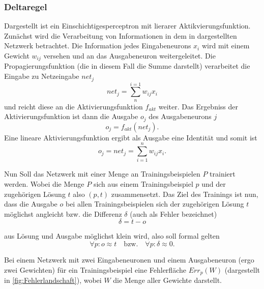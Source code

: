 \subsubsection{Deltaregel}\label{sec:deltaregel}


Dargestellt ist ein Einschichtigesperceptron mit lierarer Aktikvierungsfunktion.
Zunächst wird die Verarbeitung von Informationen in dem in  dargestellten Netzwerk betrachtet. Die Information jedes Eingabeneurons $x_i$ wird mit einem Gewicht $w_{ij}$ versehen und an das Ausgabeneuron weitergeleitet. Die Propagierungsfunktion (die in diesem Fall die Summe darstellt) verarbeitet die Eingabe zu Netzeingabe $net_j$
\begin{equation}
net_j= \sum^{i=1}_n w_{ij} x_i
\end{equation}
und reicht diese an die Aktivierungsfunktion $f_{akt}$ weiter. Das Ergebniss der Aktivierungsfunktion ist dann die Ausgabe $o_j$ des Ausgabeneurons $j$
\begin{equation}
o_j= f_{akt}(net_j).
\end{equation}
Eine lineare Aktivierungsfunktion ergibt als Ausgabe eine Identität und somit ist
\begin{equation}
o_j= net_j= \sum_{i=1}^n w_{ij} x_i.
\label{gl:ausgang}
\end{equation}

Nun Soll das Netzwerk mit einer Menge an Trainingsbeispielen $P$ trainiert werden. Wobei die Menge $P$ sich aus einem Trainingsbeispiel $p$ und der zugehörigen Lösung $t$ also $(p,t)$ zusammensetzt.
Das Ziel des Trainings ist nun, dass die Ausgabe $o$ bei allen Trainingsbeispielen sich der zugehörigen Lösung $t$ möglichst angleicht bzw. die Differenz $\delta$ (auch als Fehler bezeichnet) 
\begin{equation}
\delta=t-o
\label{gl:delta}
\end{equation}

aus Lösung und Ausgabe möglichst klein  wird, also soll formal gelten
\begin{equation*}
\forall p:o \approx t \quad \text{bzw.} \quad \forall p:\delta \approx 0.
\end{equation*}

Bei einem Netzwerk mit zwei Eingabeneuronen und einem Ausgabeneuron (ergo zwei Gewichten) für ein Trainingsbeispiel eine Fehlerfläche $Err_p(W)$ (dargestellt in \autoref{fig:Fehlerlandschaft}), wobei $W$ die Menge aller Gewichte darstellt.

